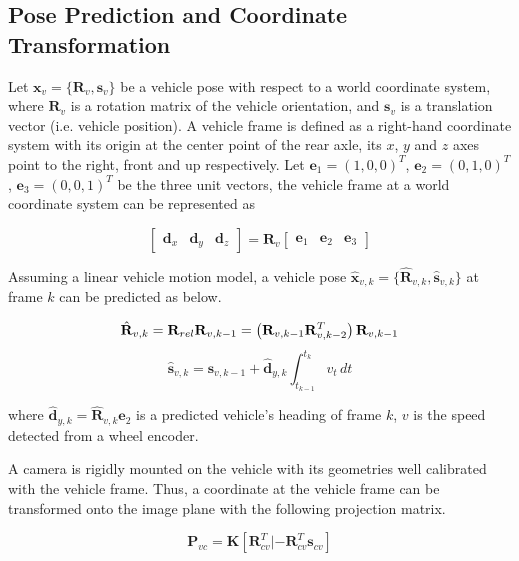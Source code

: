 \documentclass[letterpaper, 10 pt, conference]{ieeeconf}  %
\begin{document}
\subsection{Pose Prediction and Coordinate Transformation}
Let $\mathbf{x}_{v} = \{\mathbf{R}_{v}, \mathbf{s}_{v}\}$ be a vehicle pose with respect to a world coordinate system, where $\mathbf{R}_{v}$ is a rotation matrix of the vehicle orientation, and $\mathbf{s}_{v}$ is a translation vector (i.e. vehicle position).
A vehicle frame is defined as a right-hand coordinate system with its origin at the center point of the rear axle, its $x$, $y$ and $z$ axes point to the right, front and up respectively. Let $\mathbf{e}_1=(1,0,0)^T$, $\mathbf{e}_2=(0,1,0)^T$, $\mathbf{e}_3=(0,0,1)^T$ be the three unit vectors, the vehicle frame at a world coordinate system can be represented as

\begin{equation}
\begin{bmatrix} \mathbf{d}_x & \mathbf{d}_y & \mathbf{d}_z \end{bmatrix}
= \mathbf{R}_v
\begin{bmatrix} \mathbf{e}_1 & \mathbf{e}_2 & \mathbf{e}_3 \end{bmatrix}
\end{equation}

Assuming a linear vehicle motion model, a vehicle pose $\hat{\mathbf{x}}_{v,k}=\{\hat{\mathbf{R}}_{v,k},\hat{\mathbf{s}}_{v,k}\}$ at frame $k$ can be predicted as below.

\begin{equation}
\hat{\mathbf{R}}_{v,k}=\mathbf{R}_{rel}\mathbf{R}_{v,k-1}=\left(\mathbf{R}_{v,k-1}\mathbf{R}_{v,k-2}^T\right)\mathbf{R}_{v,k-1}\\
\label{eq:R_t_predict}
\end{equation}
\begin{equation}
\hat{\mathbf{s}}_{v,k}= \mathbf{s}_{v,k-1} + \hat{\mathbf{d}}_{y,k} \int_{t_{k-1}}^{t_k}{v_t}\,dt
\end{equation}

where $\hat{\mathbf{d}}_{y,k}=\hat{\mathbf{R}}_{v,k}\mathbf{e}_2$ is a predicted vehicle's heading of frame $k$, $v$ is the speed detected from a wheel encoder.

A camera is rigidly mounted on the vehicle with its geometries well calibrated with the vehicle frame. Thus, a coordinate at the vehicle frame can be transformed onto the image plane with the following projection matrix.

\begin{equation}
\mathbf{P}_{vc}=\mathbf{K}[\mathbf{R}_{cv}^T|-\mathbf{R}_{cv}^T\mathbf{s}_{cv}]
\end{equation}
\end{document}
